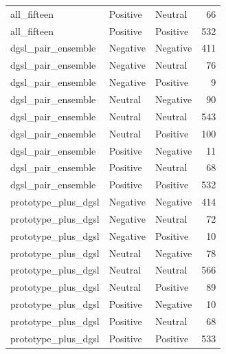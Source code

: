 \begin{tabular}{lllr}
all\_fifteen & Positive & Neutral & 66 \\
all\_fifteen & Positive & Positive & 532 \\
dgsl\_pair\_ensemble & Negative & Negative & 411 \\
dgsl\_pair\_ensemble & Negative & Neutral & 76 \\
dgsl\_pair\_ensemble & Negative & Positive & 9 \\
dgsl\_pair\_ensemble & Neutral & Negative & 90 \\
dgsl\_pair\_ensemble & Neutral & Neutral & 543 \\
dgsl\_pair\_ensemble & Neutral & Positive & 100 \\
dgsl\_pair\_ensemble & Positive & Negative & 11 \\
dgsl\_pair\_ensemble & Positive & Neutral & 68 \\
dgsl\_pair\_ensemble & Positive & Positive & 532 \\
prototype\_plus\_dgsl & Negative & Negative & 414 \\
prototype\_plus\_dgsl & Negative & Neutral & 72 \\
prototype\_plus\_dgsl & Negative & Positive & 10 \\
prototype\_plus\_dgsl & Neutral & Negative & 78 \\
prototype\_plus\_dgsl & Neutral & Neutral & 566 \\
prototype\_plus\_dgsl & Neutral & Positive & 89 \\
prototype\_plus\_dgsl & Positive & Negative & 10 \\
prototype\_plus\_dgsl & Positive & Neutral & 68 \\
prototype\_plus\_dgsl & Positive & Positive & 533 \\
\bottomrule
\end{tabular}
